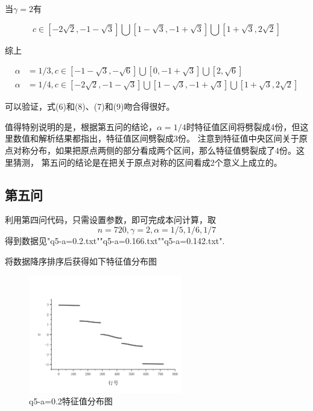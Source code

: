 \documentclass[10pt, a4paper]{article}
\begin{document}
    当$\gamma=2$有

    \[c\in[-2\sqrt{2},-1-\sqrt{3}]\bigcup[1-\sqrt{3},-1+\sqrt{3}]\bigcup[1+\sqrt{3},2\sqrt{2}]\]

    综上

    \begin{align}
        \alpha&=1/3, c\in[-1-\sqrt{3},-\sqrt{6}]\bigcup[0,-1+\sqrt{3}]\bigcup[2,\sqrt{6}]\\
        \alpha&=1/4, c\in[-2\sqrt{2},-1-\sqrt{3}]\bigcup[1-\sqrt{3},-1+\sqrt{3}]\bigcup[1+\sqrt{3},2\sqrt{2}]
    \end{align}\label{ali:q4解析}

    可以验证，式(6)和(8)、(7)和(9)吻合得很好。

    值得特别说明的是，根据第五问的结论，$\alpha=1/4$时特征值区间将劈裂成4份，但这里数值和解析结果都指出，特征值区间劈裂成3份。
    注意到特征值中央区间关于原点对称分布，如果把原点两侧的部分看成两个区间，那么特征值劈裂成了4份。这里猜测，
    第五问的结论是在把关于原点对称的区间看成2个意义上成立的。

    \subsection{第五问}

    利用第四问代码，只需设置参数，即可完成本问计算，取
    \[n=720,\gamma=2,\alpha=1/5,1/6,1/7\]得到数据见"q5-a=0.2.txt""q5-a=0.166.txt""q5-a=0.142.txt".

    将数据降序排序后获得如下特征值分布图

    \begin{figure}[H]
        \centering
        \includegraphics[width=0.6\textwidth]{q5-a=0.2特征值分布图.jpg}
        \caption{q5-a=0.2特征值分布图}\label{fig:q5-a=0.2特征值分布图}
    \end{figure}
\end{document}
